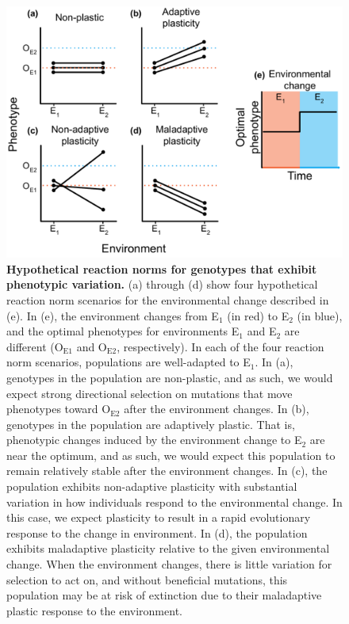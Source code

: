 \begin{figure}[h!]
    \centering
    \includegraphics[width=\textwidth]{media/reaction-norms.pdf}
    \caption{\small
    \textbf{Hypothetical reaction norms for genotypes that exhibit phenotypic variation.}
    (a) through (d) show four hypothetical reaction norm scenarios for the environmental change described in (e).  
    In (e), the environment changes from E$_1$ (in red) to E$_2$ (in blue), and the optimal phenotypes for environments E$_1$ and E$_2$ are different (O$_{\text{E}1}$ and O$_{\text{E}2}$, respectively).
    In each of the four reaction norm scenarios, populations are well-adapted to E$_1$.
    In (a), genotypes in the population are non-plastic, and as such, we would expect strong directional selection on mutations that move phenotypes toward O$_{\text{E}2}$ after the environment changes.
    In (b), genotypes in the population are adaptively plastic. 
    That is, phenotypic changes induced by the environment change to E$_2$ are near the optimum, and as such, we would expect this population to remain relatively stable after the environment changes.
    In (c), the population exhibits non-adaptive plasticity with substantial variation in how individuals respond to the environmental change. 
    In this case, we expect plasticity to result in a rapid evolutionary response to the change in environment.  
    In (d), the population exhibits maladaptive plasticity relative to the given environmental change. 
    When the environment changes, there is little variation for selection to act on, and without beneficial mutations, this population may be at risk of extinction due to their maladaptive plastic response to the environment.
    }
    \label{fig:reaction-norms}
\end{figure}

